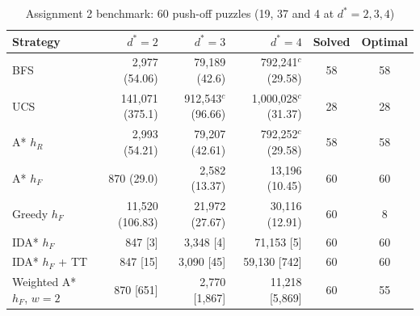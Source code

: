 \begin{table}[!htbp]
\centering\caption{Assignment 2 benchmark: 60 push-off puzzles (19, 37 and 4 at $d^*=2,3,4$)}\label{tab:a2}
\footnotesize
\begin{tabular}{@{}lrrrcc@{}}
\toprule
Strategy & $d^*=2$ & $d^*=3$ & $d^*=4$ & Solved & Optimal \\
\midrule
BFS & 2,977 (54.06) & 79,189 (42.6) & 792,241$^{c}$ (29.58) & 58 & 58 \\
UCS & 141,071 (375.1) & 912,543$^{c}$ (96.66) & 1,000,028$^{c}$ (31.37) & 28 & 28 \\
A* $h_R$ & 2,993 (54.21) & 79,207 (42.61) & 792,252$^{c}$ (29.58) & 58 & 58 \\
A* $h_F$ & 870 (29.0) & 2,582 (13.37) & 13,196 (10.45) & 60 & 60 \\
Greedy $h_F$ & 11,520 (106.83) & 21,972 (27.67) & 30,116 (12.91) & 60 & 8 \\
\midrule
IDA* $h_F$ & 847 [3] & 3,348 [4] & 71,153 [5] & 60 & 60 \\
IDA* $h_F$ + TT & 847 [15] & 3,090 [45] & 59,130 [742] & 60 & 60 \\
Weighted A* $h_F$, $w=2$ & 870 [651] & 2,770 [1,867] & 11,218 [5,869] & 60 & 55 \\
\bottomrule
\end{tabular}
\par\vspace{2pt}{\scriptsize Top: mean generated nodes (effective branching factor $b^*$), limit $10^6$; $^c$ some runs stopped at the limit. Bottom: mean generated nodes [mean peak memory in states], limit $2\times10^6$.}
\end{table}
